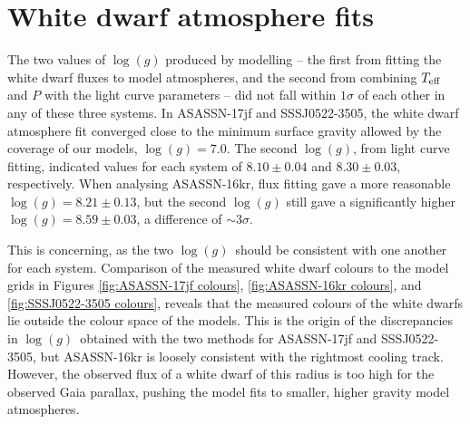 

\section{White dwarf atmosphere fits}
\label{sect:three white dwarfs:method WD atmosphere fits}

The two values of $\log (g)$ produced by modelling -- the first from fitting the white dwarf fluxes to model atmospheres, and the second from combining $T_{\rm eff}$ and $P$ with the light curve parameters -- did not fall within $1\sigma$ of each other in any of these three systems.
In ASASSN-17jf and SSSJ0522-3505, the white dwarf atmosphere fit converged close to the minimum surface gravity allowed by the coverage of our models, $\log(g) = 7.0$.
The second $\log (g)$, from light curve fitting, indicated values for each system of $8.10\pm0.04$ and $8.30\pm0.03$, respectively.
When analysing ASASSN-16kr, flux fitting gave a more reasonable $\log(g)=8.21\pm0.13$, but the second $\log (g)$ still gave a significantly higher $\log(g)=8.59\pm0.03$, a difference of $\sim3\sigma$.

This is concerning, as the two $\log (g)$\ should be consistent with one another for each system.
Comparison of the measured white dwarf colours to the \citet{Bergeron1995} model grids in Figures \ref{fig:ASASSN-17jf colours}, \ref{fig:ASASSN-16kr colours}, and \ref{fig:SSSJ0522-3505 colours}, reveals that the measured colours of the white dwarfs lie outside the colour space of the models. This is the origin of the discrepancies in $\log (g)$\ obtained with the two methods for ASASSN-17jf and SSSJ0522-3505, but ASASSN-16kr is loosely consistent with the rightmost cooling track. However, the observed flux of a white dwarf of this radius is too high for the observed Gaia parallax, pushing the model fits to smaller, higher gravity model atmospheres.

